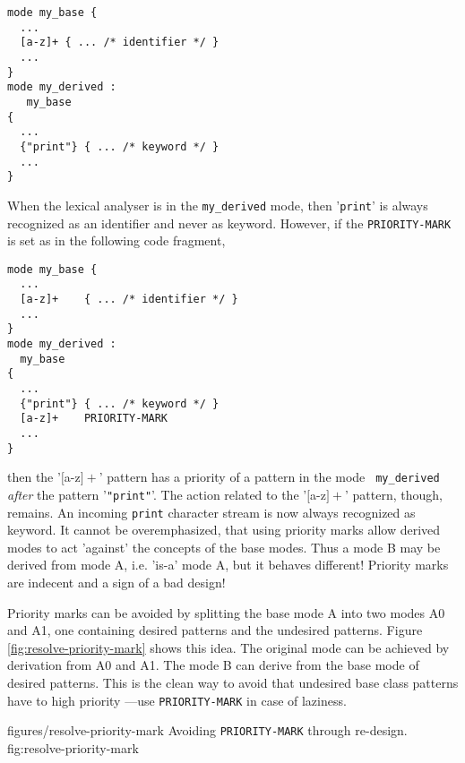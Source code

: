 \begin{lstlisting}
mode my_base {
  ...
  [a-z]+ { ... /* identifier */ }
  ...
}
mode my_derived :
   my_base 
{
  ...
  {"print"} { ... /* keyword */ }
  ...
}
\end{lstlisting}
When the lexical analyser is in the {\tt my\_derived} mode, then '{\tt print}'
is always recognized as an identifier and never as keyword. However, if the
{\tt PRIORITY-MARK} is set as in the following code fragment,
\begin{lstlisting}
mode my_base {
  ...
  [a-z]+    { ... /* identifier */ }
  ...
}
mode my_derived :
  my_base 
{
  ...
  {"print"} { ... /* keyword */ }
  [a-z]+    PRIORITY-MARK
  ...
}
\end{lstlisting}
then the '{$[$a-z$]+$}' pattern has a priority of a pattern in the mode {\tt
  my\_derived} {\it after} the pattern '{\tt "print"}'. The action related to
the '{$[$a-z$]+$}' pattern, though, remains. An incoming {\tt print} character
stream is now always recognized as keyword. It cannot be overemphasized, that
using priority marks allow derived modes to act 'against' the concepts of the
base modes. Thus a mode B may be derived from mode A, i.e. 'is-a' mode A, but
it behaves different! Priority marks are indecent and a sign of a bad design! 

Priority marks can be avoided by splitting the base mode A into two modes A0 and A1, one
containing desired patterns and the undesired patterns. Figure
\ref{fig:resolve-priority-mark} shows this idea. The original mode can be achieved by
derivation from A0 and A1. The mode B can derive from the base mode of desired patterns.
This is the clean way to avoid that undesired base class patterns have to high priority
---use {\tt PRIORITY-MARK} in case of laziness.

\showpic
{figures/resolve-priority-mark}
{Avoiding {\tt PRIORITY-MARK} through re-design.}
{fig:resolve-priority-mark}
